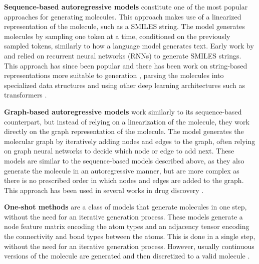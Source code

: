 \textbf{Sequence-based autoregressive models} constitute one of the most popular approaches for
generating molecules. This approach makes use of a linearized representation of the molecule, such
as a SMILES string. The model generates molecules by sampling one token at a time,
conditioned on the previously sampled tokens, similarly to how a language model generates text.
Early work by \citep{seglerGeneratingFocusedMolecule2018} and
\citep{gomez-bombarelliAutomaticChemicalDesign2018} relied on recurrent neural networks (RNNs) to
generate SMILES strings. This approach has since been popular and there has been work on
string-based representations more suitable to generation
\citep{oboyleDeepSMILESAdaptationSMILES2018,krennSelfReferencingEmbeddedStrings2020,noutahiGottaBeSAFE2023},
parsing the molecules into specialized data structures
\citep{kusnerGrammarVariationalAutoencoder2017,jinJunctionTreeVariational2018} and using other deep
learning architectures such as transformers
\citep{vaswaniAttentionAllYou2017,noutahiGottaBeSAFE2023,schwallerMolecularTransformerModel2019,bagalMolGPTMolecularGeneration2022,mazuzMoleculeGenerationUsing2023}.

\textbf{Graph-based autoregressive models} work similarly to its sequence-based counterpart, but
instead of relying on a linearization of the molecule, they work directly on the graph
representation of the molecule. The model generates the molecular graph by iteratively adding nodes
and edges to the graph, often relying on graph neural networks to decide which node or edge to add
next. These models are similar to the sequence-based models described above, as they also generate
the molecule in an autoregressive manner, but are more complex as there is no prescribed order in
which nodes and edges are added to the graph. This approach has been used in several works in drug
discovery
\citep{liuConstrainedGraphVariational2018,liLearningDeepGenerative2018,youGraphConvolutionalPolicy2019,cohen-karlikOvercomingOrderAutoregressive2024}.

\textbf{One-shot methods} are a class of models that generate molecules in one step, without the
need for an iterative generation process. These models generate a node feature
matrix encoding the atom types and an adjacency tensor encoding the connectivity and bond types
between the atoms. This is done in a single step, without the need for an iterative generation
process. However, usually continuous versions of the molecule are generated and then discretized to
a valid molecule \citep{decaoMolGANImplicitGenerative2018,madhawaGraphNVPInvertibleFlow2019}.

